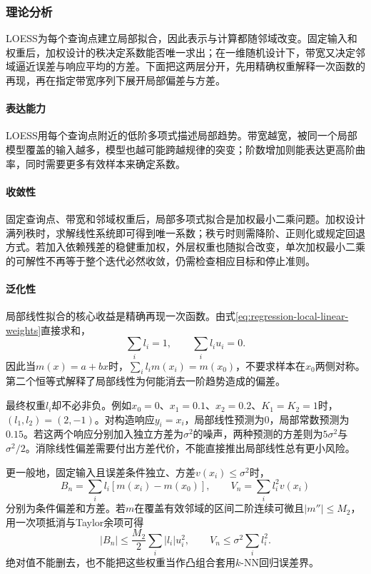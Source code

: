 \subsubsection{理论分析}
\label{sec:regression-loess-theory}

LOESS为每个查询点建立局部拟合，因此表示与计算都随邻域改变。固定输入和权重后，加权设计的秩决定系数能否唯一求出；在一维随机设计下，带宽又决定邻域逼近误差与响应平均的方差。下面把这两层分开，先用精确权重解释一次函数的再现，再在指定带宽序列下展开局部偏差与方差。

\paragraph{表达能力}
LOESS用每个查询点附近的低阶多项式描述局部趋势。带宽越宽，被同一个局部模型覆盖的输入越多，模型也越可能跨越规律的突变；阶数增加则能表达更高阶曲率，同时需要更多有效样本来确定系数。

\paragraph{收敛性}
固定查询点、带宽和邻域权重后，局部多项式拟合是加权最小二乘问题。加权设计满列秩时，求解线性系统即可得到唯一系数；秩亏时则需降阶、正则化或规定回退方式。若加入依赖残差的稳健重加权，外层权重也随拟合改变，单次加权最小二乘的可解性不再等于整个迭代必然收敛，仍需检查相应目标和停止准则。

\paragraph{泛化性}
局部线性拟合的核心收益是精确再现一次函数。由式\eqref{eq:regression-local-linear-weights}直接求和，
\[
  \sum_i l_i=1,\qquad \sum_i l_i u_i=0.
\]
因此当$m(x)=a+bx$时，$\sum_i l_i m(x_i)=m(x_0)$，不要求样本在$x_0$两侧对称。第二个恒等式解释了局部线性为何能消去一阶趋势造成的偏差。

最终权重$l_i$却不必非负。例如$x_0=0$、$x_1=0.1$、$x_2=0.2$、$K_1=K_2=1$时，$(l_1,l_2)=(2,-1)$。对构造响应$y_i=x_i$，局部线性预测为$0$，局部常数预测为$0.15$。若这两个响应分别加入独立方差为$\sigma^2$的噪声，两种预测的方差则为$5\sigma^2$与$\sigma^2/2$。消除线性偏差需要付出方差代价，不能直接推出局部线性总有更小风险。

更一般地，固定输入且误差条件独立、方差$v(x_i)\leq\sigma^2$时，
\[
  B_n=\sum_i l_i[m(x_i)-m(x_0)],\qquad
  V_n=\sum_i l_i^2v(x_i)
\]
分别为条件偏差和方差。若$m$在覆盖有效邻域的区间二阶连续可微且$|m''|\leq M_2$，用一次项抵消与Taylor余项可得
\[
  |B_n|\leq\frac{M_2}{2}\sum_i|l_i|u_i^2,\qquad
  V_n\leq\sigma^2\sum_i l_i^2.
\]
绝对值不能删去，也不能把这些权重当作凸组合套用$k$-NN回归误差界。

